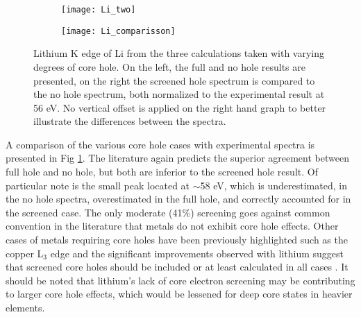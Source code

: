\begin{figure}
	\centering
	\begin{subfigure}{0.45\textwidth}
		\texttt{[image: Li\_two]}
	\end{subfigure}
	\hspace{-0.01cm}
	\begin{subfigure}{0.45\textwidth}
		\texttt{[image: Li\_comparisson]}
	\end{subfigure}

	\caption{Lithium K edge of Li from the three calculations taken with varying degrees of core hole. On the left, the full and no hole results are presented, on the right the screened hole spectrum is compared to the no hole spectrum, both normalized to the experimental result at 56 eV. No vertical offset is applied on the right hand graph to better illustrate the differences between the spectra. }
	\label{Li_spectra}
\end{figure}


A comparison of the various core hole cases with experimental spectra is presented in Fig \ref{Li_spectra}. The literature again predicts the superior agreement between full hole and no hole, but both are inferior to the screened hole result.  Of particular note is the small peak located at $ \sim$58 eV, which is underestimated, in the no hole spectra, overestimated in the full hole, and correctly accounted for in the screened case.  The only moderate (41\%) screening goes against common convention in the literature that metals do not exhibit core hole effects.  Other cases of metals requiring core holes have been previously highlighted such as the copper L$_3$ edge and the significant improvements observed with lithium suggest that screened core holes should be included or at least calculated in all cases \cite{hebert_improvement_2003}.  It should be noted that lithium's lack of core electron screening may be contributing to larger core hole effects, which would be lessened for deep core states in heavier elements. 

